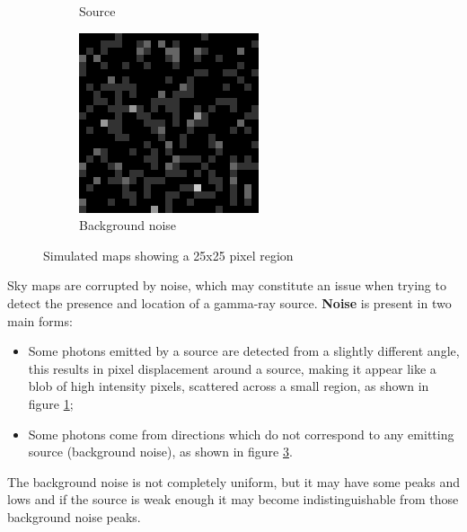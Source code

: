 \documentclass[a4paper,12pt,oneside]{book}
\begin{document}
\begin{onehalfspace}
\begin{figure}[h!]
\begin{subfigure}{.3\textwidth}
		\caption{Source}
		\label{fig:sourceonly}
	\end{subfigure}
	\begin{subfigure}{.3\textwidth}
		\centering
		\includegraphics[width=\linewidth]{bgonlyzoom}
		\caption{Background noise}
		\label{fig:bgonlyzoom}
	\end{subfigure}
	\caption{Simulated maps showing a 25x25 pixel region}
	\end{figure}
    
    Sky maps are corrupted by noise, which may constitute an issue when trying to detect the presence and location of a gamma-ray source. \textbf{Noise} is present in two main forms:
    \begin{itemize}
		\setlength\itemsep{0em}
        \item Some photons emitted by a source are detected from a slightly different angle, this results in pixel displacement around a source, making it appear like a blob of high intensity pixels, scattered across a small region, as shown in figure \ref{fig:sourceonly};
        \item Some photons come from directions which do not correspond to any emitting source (background noise), as shown in figure \ref{fig:bgonlyzoom}.
	\end{itemize}
	The background noise is not completely uniform, but it may have some peaks and lows and if the source is weak enough it may become indistinguishable from those background noise peaks. 
	

\end{onehalfspace}
\end{document}
